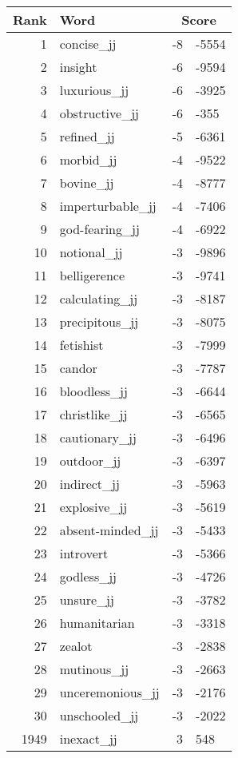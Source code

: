 \begin{longtable}[!htbp]{| rlr@{.}l |}
    \hline
    \textbf{Rank} & \textbf{Word} & \multicolumn{2}{c|}{\textbf{Score}} \\
    \hline
    \endhead
    1 & concise\_jj & -8 & -5554 \\
    2 & insight & -6 & -9594 \\
    3 & luxurious\_jj & -6 & -3925 \\
    4 & obstructive\_jj & -6 & -355 \\
    5 & refined\_jj & -5 & -6361 \\
    6 & morbid\_jj & -4 & -9522 \\
    7 & bovine\_jj & -4 & -8777 \\
    8 & imperturbable\_jj & -4 & -7406 \\
    9 & god-fearing\_jj & -4 & -6922 \\
    10 & notional\_jj & -3 & -9896 \\
    11 & belligerence & -3 & -9741 \\
    12 & calculating\_jj & -3 & -8187 \\
    13 & precipitous\_jj & -3 & -8075 \\
    14 & fetishist & -3 & -7999 \\
    15 & candor & -3 & -7787 \\
    16 & bloodless\_jj & -3 & -6644 \\
    17 & christlike\_jj & -3 & -6565 \\
    18 & cautionary\_jj & -3 & -6496 \\
    19 & outdoor\_jj & -3 & -6397 \\
    20 & indirect\_jj & -3 & -5963 \\
    21 & explosive\_jj & -3 & -5619 \\
    22 & absent-minded\_jj & -3 & -5433 \\
    23 & introvert & -3 & -5366 \\
    24 & godless\_jj & -3 & -4726 \\
    25 & unsure\_jj & -3 & -3782 \\
    26 & humanitarian & -3 & -3318 \\
    27 & zealot & -3 & -2838 \\
    28 & mutinous\_jj & -3 & -2663 \\
    29 & unceremonious\_jj & -3 & -2176 \\
    30 & unschooled\_jj & -3 & -2022 \\
    1949 & inexact\_jj & 3 & 548 \\

\end{longtable}
